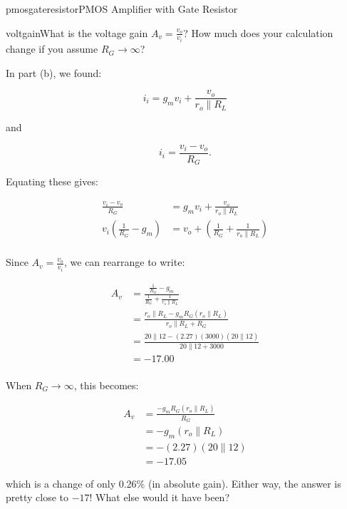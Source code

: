 \begin{mainquestion}{pmosgateresistor}{PMOS Amplifier with Gate Resistor}
\begin{partquestion}{voltgain}{What is the voltage gain $A_{v} = \frac{v_{o}}{v_{i}}$? How much does your calculation change if you assume $R_{G} \rightarrow \infty$?}
\begin{answer}
In part (b), we found:

\[
i_{i} = g_{m}v_{i} + \frac{v_{o}}{r_{o} \parallel R_{L}}
\]

and

\[
i_{i} = \frac{v_{i} - v_{o}}{R_{G}}.
\]

Equating these gives:

\begin{align*}
    \frac{v_i - v_o}{R_G} &= g_m v_i + \frac{v_o}{r_o \parallel R_L} \\
    v_i\left(\frac{1}{R_G} - g_m\right) &= v_o + \left(\frac{1}{R_G} + \frac{1}{r_o \parallel R_L}\right) \\
\end{align*}

Since $A_{v} = \frac{v_{o}}{v_{i}}$, we can rearrange to write:

\begin{align*}
    A_v &= \frac{\frac{1}{R_G} - g_m}{\frac{1}{R_G} + \frac{1}{r_o \parallel R_L}} \\
    &= \frac{r_o \parallel R_L - g_m R_G(r_o \parallel R_L)}{r_o \parallel R_L + R_G} \\
    &= \frac{20 \parallel 12 - (2.27) (3000) (20 \parallel 12)}{20 \parallel 12 + 3000} \\
    &= -17.00 \\
\end{align*}

When $R_{G} \rightarrow \infty$, this becomes:

\begin{align*}
    A_v &= \frac{-g_m R_G (r_o \parallel R_L)}{R_G} \\
    &= -g_m (r_o \parallel R_L) \\
    &= -(2.27) (20 \parallel 12) \\
    &= -17.05
\end{align*}

which is a change of only 0.26\% (in absolute gain). Either way, the answer is pretty close to $-17$! What else would it have been?
\end{answer}
\end{partquestion}

\end{mainquestion}
